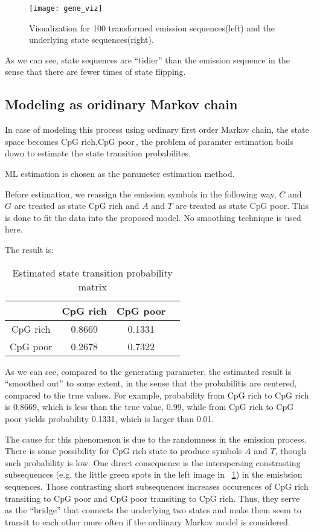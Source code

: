 \documentclass[paper=a4, fontsize=11pt]{scrartcl} %
\numberwithin{equation}{section} %
\numberwithin{figure}{section} %
\numberwithin{table}{section} %
\begin{document}
\begin{figure}[H]
  \centering
  \texttt{[image: gene\_viz]}
  \caption {Visualization for 100 transformed emission sequences(left) and the underlying state sequences(right).}
  \label {fig:5.gene_viz}
\end{figure}

As we can see, state sequences are ``tidier'' than the emission sequence in the sense that there are fewer times of state flipping.

\subsection {Modeling as oridinary Markov chain}

In case of modeling this process using ordinary first order Markov chain, the state space becomes ${\text{CpG rich}, \text{CpG poor}}$, the problem of paramter estimation boils down to estimate the state transition probabilites.

ML estimation is chosen as the  parameter estimation method. 

Before estimation, we reassign the emission symbols in the following way, $C$ and $G$ are treated as state CpG rich and $A$ and $T$ are treated as state CpG poor.  This is done to fit the data into the proposed model. No smoothing technique is used here.

The result is:

\begin{table}[H]
\caption{Estimated state transition probability matrix}
\centering
\begin{tabular}{c|ccc}
  & CpG rich & CpG poor  \\ \hline
  CpG rich & 0.8669 &   0.1331 \\
  CpG poor & 0.2678 &   0.7322
\end {tabular}
\end {table}

As we can see, compared to the generating parameter, the estimated result is ``smoothed out'' to some extent, in the sense that the probabilitis are centered, compared to the true values. For example, probability from CpG rich to CpG rich is 0.8669, which is less than the true value, 0.99, while from CpG rich to CpG poor yields probability 0.1331, which is larger than 0.01.

The cause for this phenomenon is due to the randomness in the emission process. There is some possibility for CpG rich state to produce symbols $A$ and $T$, though such probability is low. One direct consequence is the interspersing constrasting subsequences (e.g, the little green spots in the left image in ~\ref{fig:5.gene_viz}) in the emisbsion sequences. Those contrasting short subsequences increases occurences of CpG rich transiting to CpG poor and CpG poor transiting to CpG rich. Thus, they serve as the ``bridge'' that connects the underlying two states and make them seem to transit to each other more often if the ordiinary Markov model is considered.
\end{document}
